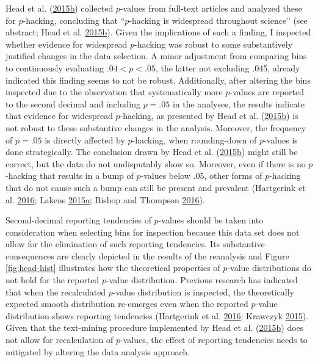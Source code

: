 \documentclass[a5paper]{book}
\begin{document}
Head et al.
(\protect\hyperlink{ref-doi:10.1371ux2fjournal.pbio.1002106}{2015}\protect\hyperlink{ref-doi:10.1371ux2fjournal.pbio.1002106}{b})
collected \(p\)-values from full-text articles and analyzed these for
\(p\)-hacking, concluding that \enquote{\(p\)-hacking is widespread
throughout science} (see abstract; Head et al.
\protect\hyperlink{ref-doi:10.1371ux2fjournal.pbio.1002106}{2015}\protect\hyperlink{ref-doi:10.1371ux2fjournal.pbio.1002106}{b}).
Given the implications of such a finding, I inspected whether evidence
for widespread \(p\)-hacking was robust to some substantively justified
changes in the data selection. A minor adjustment from comparing bins to
continuously evaluating \(.04<p<.05\), the latter not excluding .045,
already indicated this finding seems to not be robust. Additionally,
after altering the bins inspected due to the observation that
systematically more \(p\)-values are reported to the second decimal and
including \(p=.05\) in the analyses, the results indicate that evidence
for widespread \(p\)-hacking, as presented by Head et al.
(\protect\hyperlink{ref-doi:10.1371ux2fjournal.pbio.1002106}{2015}\protect\hyperlink{ref-doi:10.1371ux2fjournal.pbio.1002106}{b})
is not robust to these substantive changes in the analysis. Moreover,
the frequency of \(p=.05\) is directly affected by \(p\)-hacking, when
rounding-down of \(p\)-values is done strategically. The conclusion
drawn by Head et al.
(\protect\hyperlink{ref-doi:10.1371ux2fjournal.pbio.1002106}{2015}\protect\hyperlink{ref-doi:10.1371ux2fjournal.pbio.1002106}{b})
might still be correct, but the data do not undisputably show so.
Moreover, even if there is no \(p\)-hacking that results in a bump of
\(p\)-values below .05, other forms of \(p\)-hacking that do not cause
such a bump can still be present and prevalent (Hartgerink et al.
\protect\hyperlink{ref-doi:10.7717ux2fpeerj.1935}{2016}; Lakens
\protect\hyperlink{ref-doi:10.1080ux2f17470218.2014.982664}{2015}\protect\hyperlink{ref-doi:10.1080ux2f17470218.2014.982664}{a};
Bishop and Thompson
\protect\hyperlink{ref-doi:10.7717ux2fpeerj.1715}{2016}).

Second-decimal reporting tendencies of \(p\)-values should be taken into
consideration when selecting bins for inspection because this data set
does not allow for the elimination of such reporting tendencies. Its
substantive consequences are clearly depicted in the results of the
reanalysis and Figure \ref{fig:head-hist} illustrates how the
theoretical properties of \(p\)-value distributions do not hold for the
reported \(p\)-value distribution. Previous research has indicated that
when the recalculated \(p\)-value distribution is inspected, the
theoretically expected smooth distribution re-emerges even when the
reported \(p\)-value distribution shows reporting tendencies (Hartgerink
et al. \protect\hyperlink{ref-doi:10.7717ux2fpeerj.1935}{2016}; Krawczyk
\protect\hyperlink{ref-doi:10.1371ux2fjournal.pone.0127872}{2015}).
Given that the text-mining procedure implemented by Head et al.
(\protect\hyperlink{ref-doi:10.1371ux2fjournal.pbio.1002106}{2015}\protect\hyperlink{ref-doi:10.1371ux2fjournal.pbio.1002106}{b})
does not allow for recalculation of \(p\)-values, the effect of
reporting tendencies needs to mitigated by altering the data analysis
approach.
\end{document}
